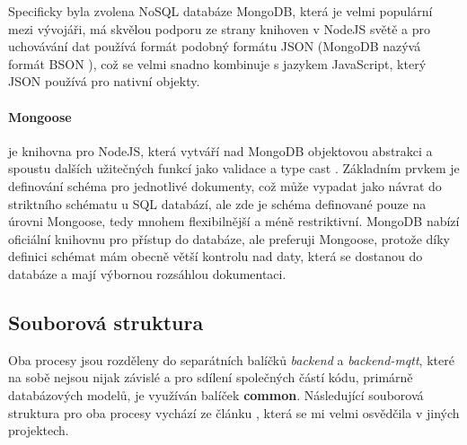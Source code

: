 Specificky byla zvolena NoSQL databáze MongoDB, která je velmi populární mezi vývojáři, má skvělou podporu ze strany knihoven v NodeJS světě a pro uchovávání dat používá formát podobný formátu JSON (MongoDB nazývá formát BSON \cite{bson-vs-json}), což se velmi snadno kombinuje s jazykem JavaScript, který JSON používá pro nativní objekty.

\paragraph{Mongoose} je knihovna pro NodeJS, která vytváří nad MongoDB objektovou abstrakci a spoustu dalších užitečných funkcí jako validace a type cast \cite{mongoose}. Základním prvkem je definování schéma pro jednotlivé dokumenty, což může vypadat jako návrat do striktního schématu u SQL databází, ale zde je schéma definované pouze na úrovni Mongoose, tedy mnohem flexibilnější a méně restriktivní. MongoDB nabízí oficiální knihovnu pro přístup do databáze, ale preferuji Mongoose, protože díky definici schémat mám obecně větší kontrolu nad daty, která se dostanou do databáze a mají výbornou rozsáhlou dokumentaci.

\subsection{Souborová struktura}
Oba procesy jsou rozděleny do separátních balíčků \textit{backend} a \textit{backend-mqtt}, které na sobě nejsou nijak závislé a pro sdílení společných částí kódu, primárně databázových modelů, je využíván balíček \textbf{common}. Následující souborová struktura pro oba procesy vychází ze článku \cite[Bulletproof node.js project architecture]{bolletproof-architecture}, která se mi velmi osvědčila v jiných projektech.


